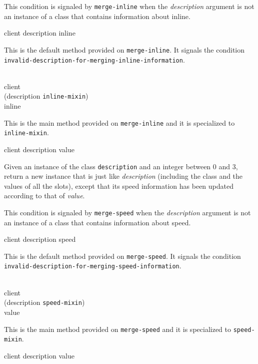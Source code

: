{\footnotesize
{}
}

This condition is signaled by \texttt{merge-inline} when the
\textit{description} argument is not an instance of a class that
contains information about inline.

{\footnotesize
{} {client description inline}
}

This is the default method provided on \texttt{merge-inline}.  It
signals the condition
\texttt{invalid-description-for-merging-inline-information}.

{\footnotesize
{}\\
           {client\\
            (description {\tt inline-mixin})\\
            inline}
}

This is the main method provided on \texttt{merge-inline}
and it is specialized to \texttt{inline-mixin}.

{\footnotesize
{} {client description value}
}

Given an instance of the class \texttt{description} and an
integer between $0$ and $3$, return a new instance that is just like
\textit{description} (including the class and the values of
all the slots), except that its speed information has been updated
according to that of \textit{value}.

{\footnotesize
{}
}

This condition is signaled by \texttt{merge-speed} when the
\textit{description} argument is not an instance of a class that
contains information about speed.

{\footnotesize
{} {client description speed}
}

This is the default method provided on \texttt{merge-speed}.  It
signals the condition
\texttt{invalid-description-for-merging-speed-information}.

{\footnotesize
{}\\
           {client\\
            (description {\tt speed-mixin})\\
            value}
}

This is the main method provided on \texttt{merge-speed} and it is
specialized to \texttt{speed-mixin}.

{\footnotesize
{} {client description value}
}

